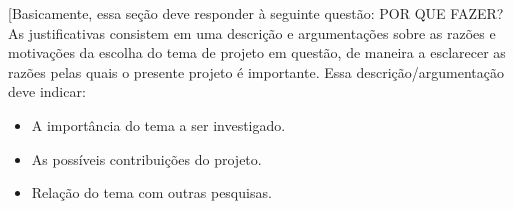 [Basicamente, essa seção deve responder à seguinte questão: POR QUE FAZER?
As justificativas consistem em uma descrição e argumentações sobre as razões e motivações da escolha do tema de projeto em questão, de maneira a esclarecer as razões pelas quais o presente projeto é importante.
Essa descrição/argumentação deve indicar:
\begin{itemize}
	\item A importância do tema a ser investigado.
	\item As possíveis contribuições do projeto.
	\item Relação do tema com outras pesquisas.
\end{itemize}
